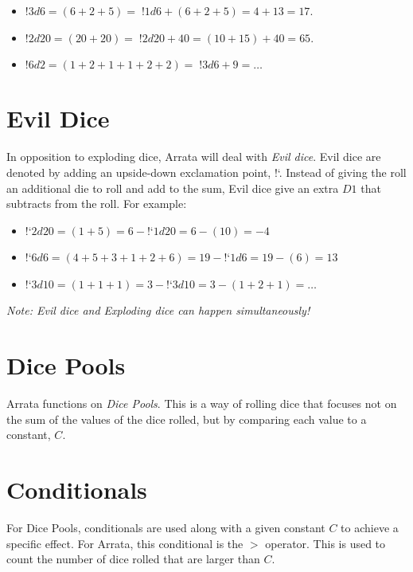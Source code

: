 \documentclass[../main.tex]{subfiles}
\begin{document}
    \begin{itemize}
        \item $!3d6 = (6 + 2 + 5) =\; !1d6 + (6 + 2 + 5) = 4 + 13 = 17$.
        \item $!2d20 = (20 + 20) =\; !2d20 + 40 = (10 + 15) + 40 = 65$.
        \item $!6d2 = (1 + 2 + 1 + 1 + 2 + 2) =\; !3d6 + 9 = \dots$
    \end{itemize}

    \section{Evil Dice}

    In opposition to exploding dice, Arrata will deal with {\em Evil dice}. Evil dice are denoted by adding an upside-down exclamation point, !`. Instead of giving the roll an additional die to roll and add to the sum, Evil dice give an extra $D1$ that subtracts from the roll. For example:

    \begin{itemize}
        \item!`$2d20 = (1 + 5) = 6 - $!`$1d20 = 6 - (10) = -4$
        \item!`$6d6 = (4 + 5 + 3 + 1 + 2 + 6) = 19 - $!`$1d6 = 19 - (6) = 13$
        \item!`$3d10 = (1 + 1 + 1) = 3 - $!`$3d10 = 3 - (1 + 2 + 1) = \dots$
    \end{itemize}

    {\em Note: Evil dice and Exploding dice can happen simultaneously!}

    \section{Dice Pools}

    Arrata functions on {\em Dice Pools}. This is a way of rolling dice that focuses not on the sum of the values of the dice rolled, but by comparing each value to a constant, $C$.

    \section{Conditionals}

    For Dice Pools, conditionals are used along with a given constant $C$ to achieve a specific effect. For Arrata, this conditional is the $>$ operator. This is used to count the number of dice rolled that are larger than $C$.
\end{document}
